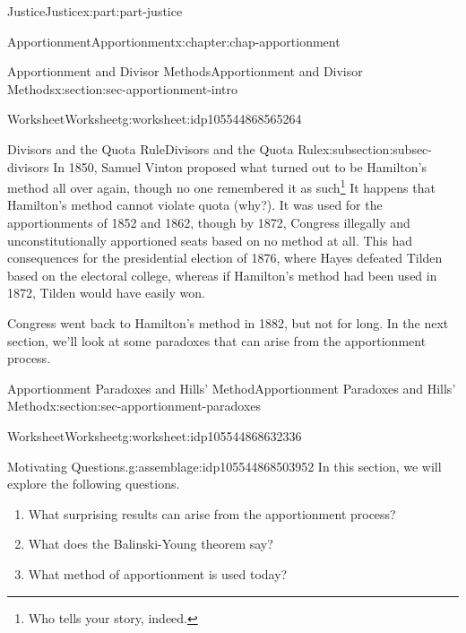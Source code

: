 \documentclass[oneside,10pt,]{book}
\numberwithin{equation}{section}
\begin{document}
\begin{partptx}{Justice}{}{Justice}{}{}{x:part:part-justice}
\begin{chapterptx}{Apportionment}{}{Apportionment}{}{}{x:chapter:chap-apportionment}
\begin{sectionptx}{Apportionment and Divisor Methods}{}{Apportionment and Divisor Methods}{}{}{x:section:sec-apportionment-intro}
\begin{worksheet-subsection}{Worksheet}{}{Worksheet}{}{}{g:worksheet:idp105544868565264}
\begin{subsectionptx}{Divisors and the Quota Rule}{}{Divisors and the Quota Rule}{}{}{x:subsection:subsec-divisors}
In 1850, Samuel Vinton proposed what turned out to be Hamilton's method all over again, though no one remembered it as such\footnote{Who tells your story, indeed.\label{g:fn:idp105544868175504}} It happens that Hamilton's method cannot violate quota (why?). It was used for the apportionments of 1852 and 1862, though by 1872, Congress illegally and unconstitutionally apportioned seats based on no method at all. This had consequences for the presidential election of 1876, where Hayes defeated Tilden based on the electoral college, whereas if Hamilton's method had been used in 1872, Tilden would have easily won.%
\par
Congress went back to Hamilton's method in 1882, but not for long. In the next section, we'll look at some paradoxes that can arise from the apportionment process.%
\end{subsectionptx}
\end{worksheet-subsection}
\restoregeometry
\end{sectionptx}
%
%
\typeout{************************************************}
\typeout{************************************************}
%
\begin{sectionptx}{Apportionment Paradoxes and Hills' Method}{}{Apportionment Paradoxes and Hills' Method}{}{}{x:section:sec-apportionment-paradoxes}
%
%
\typeout{************************************************}
\typeout{************************************************}
%
\begin{worksheet-subsection}{Worksheet}{}{Worksheet}{}{}{g:worksheet:idp105544868632336}
\begin{assemblage}{Motivating Questions.}{g:assemblage:idp105544868503952}%
In this section, we will explore the following questions. %
\begin{enumerate}[label=(\alph*)]
\item{}What surprising results can arise from the apportionment process?%
\item{}What does the Balinski-Young theorem say?%
\item{}What method of apportionment is used today?%
\end{enumerate}
%
\end{assemblage}

\end{worksheet-subsection}
\end{sectionptx}
\end{chapterptx}
\end{partptx}
\end{document}
